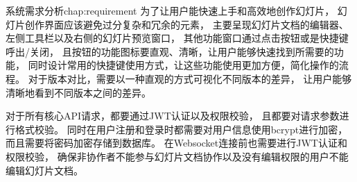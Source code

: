 \begin{cuzchapter}{系统需求分析}{chap:requirement}
为了让用户能快速上手和高效地创作幻灯片，
幻灯片创作界面应该避免过分复杂和冗余的元素，
主要呈现幻灯片文档的编辑器、左侧工具栏以及右侧的幻灯片预览窗口，
其他功能窗口通过点击按钮或是快捷键呼出/关闭，
且按钮的功能图标要直观、清晰，让用户能够快速找到所需要的功能，
同时设计常用的快捷键使用方式，让这些功能使用更加方便，简化操作的流程。
对于版本对比，需要以一种直观的方式可视化不同版本的差异，
让用户能够清晰地看到不同版本之间的差异。

对于所有核心API请求，都要通过JWT认证以及权限校验，
且都要对请求参数进行格式校验。
同时在用户注册和登录时都需要对用户信息使用bcrypt进行加密，
而且需要将密码加密存储到数据库。
在Websocket连接前也需要进行JWT认证和权限校验，
确保非协作者不能参与幻灯片文档协作以及没有编辑权限的用户不能编辑幻灯片文档。

\end{cuzchapter}
